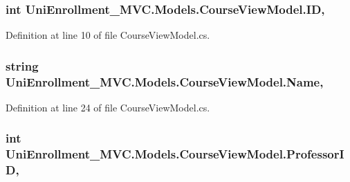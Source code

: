 \subsubsection[{\texorpdfstring{ID}{ID}}]{\setlength{\rightskip}{0pt plus 5cm}int Uni\+Enrollment\+\_\+\+M\+V\+C.\+Models.\+Course\+View\+Model.\+ID\hspace{0.3cm}{\ttfamily [get]}, {\ttfamily [set]}}\hypertarget{class_uni_enrollment___m_v_c_1_1_models_1_1_course_view_model_a6cdbca7e6c66c9505f4846935b355d6a}{}\label{class_uni_enrollment___m_v_c_1_1_models_1_1_course_view_model_a6cdbca7e6c66c9505f4846935b355d6a}


Definition at line 10 of file Course\+View\+Model.\+cs.

\subsubsection[{\texorpdfstring{Name}{Name}}]{\setlength{\rightskip}{0pt plus 5cm}string Uni\+Enrollment\+\_\+\+M\+V\+C.\+Models.\+Course\+View\+Model.\+Name\hspace{0.3cm}{\ttfamily [get]}, {\ttfamily [set]}}\hypertarget{class_uni_enrollment___m_v_c_1_1_models_1_1_course_view_model_a0ef4a9c7d23d04916bdc2202afea3a3f}{}\label{class_uni_enrollment___m_v_c_1_1_models_1_1_course_view_model_a0ef4a9c7d23d04916bdc2202afea3a3f}


Definition at line 24 of file Course\+View\+Model.\+cs.

\subsubsection[{\texorpdfstring{Professor\+ID}{ProfessorID}}]{\setlength{\rightskip}{0pt plus 5cm}int Uni\+Enrollment\+\_\+\+M\+V\+C.\+Models.\+Course\+View\+Model.\+Professor\+ID\hspace{0.3cm}{\ttfamily [get]}, {\ttfamily [set]}}\hypertarget{class_uni_enrollment___m_v_c_1_1_models_1_1_course_view_model_a8fac888ed7328928c0551a8b0f2c85e8}{}\label{class_uni_enrollment___m_v_c_1_1_models_1_1_course_view_model_a8fac888ed7328928c0551a8b0f2c85e8}


